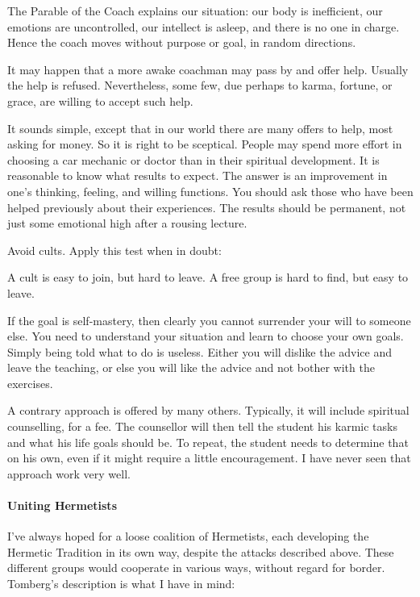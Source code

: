 The Parable of the Coach explains our situation: our body is inefficient, our emotions are uncontrolled, our intellect is asleep, and there is no one in charge. Hence the coach moves without purpose or goal, in random directions.

It may happen that a more awake coachman may pass by and offer help. Usually the help is refused. Nevertheless, some few, due perhaps to karma, fortune, or grace, are willing to accept such help.

It sounds simple, except that in our world there are many offers to help, most asking for money. So it is right to be sceptical. People may spend more effort in choosing a car mechanic or doctor than in their spiritual development. It is reasonable to know what results to expect. The answer is an improvement in one's thinking, feeling, and willing functions. You should ask those who have been helped previously about their experiences. The results should be permanent, not just some emotional high after a rousing lecture.

Avoid cults. Apply this test when in doubt:

\begin{quotex}
A cult is easy to join, but hard to leave. A free group is hard to find, but easy to leave. 

\end{quotex}
If the goal is self-mastery, then clearly you cannot surrender your will to someone else. You need to understand your situation and learn to choose your own goals. Simply being told what to do is useless. Either you will dislike the advice and leave the teaching, or else you will like the advice and not bother with the exercises.

A contrary approach is offered by many others. Typically, it will include spiritual counselling, for a fee. The counsellor will then tell the student his karmic tasks and what his life goals should be. To repeat, the student needs to determine that on his own, even if it might require a little encouragement. I have never seen that approach work very well.

\paragraph{Uniting Hermetists}
I've always hoped for a loose coalition of Hermetists, each developing the Hermetic Tradition in its own way, despite the attacks described above. These different groups would cooperate in various ways, without regard for border. Tomberg's description is what I have in mind:

